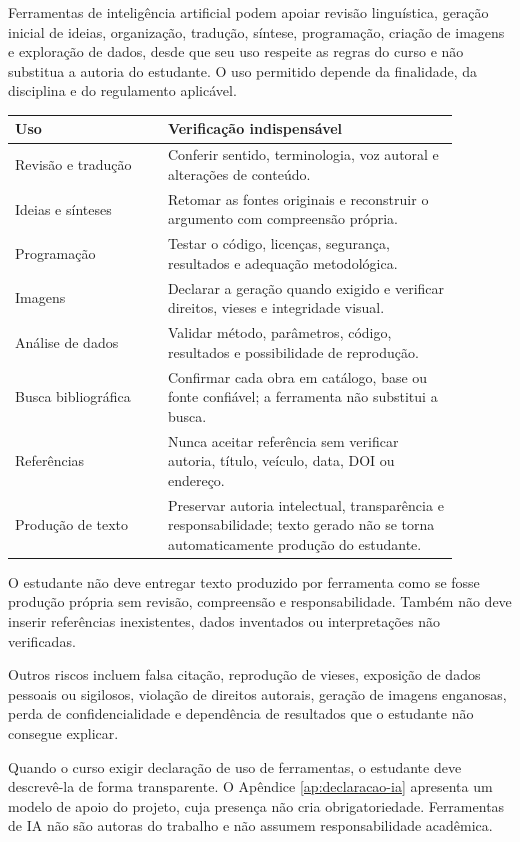 Ferramentas de inteligência artificial podem apoiar revisão linguística, geração inicial de ideias, organização, tradução, síntese, programação, criação de imagens e exploração de dados, desde que seu uso respeite as regras do curso e não substitua a autoria do estudante. O uso permitido depende da finalidade, da disciplina e do regulamento aplicável.

\begin{longtable}{p{0.30\linewidth}p{0.58\linewidth}}
\toprule
Uso & Verificação indispensável \\
\midrule
Revisão e tradução & Conferir sentido, terminologia, voz autoral e alterações de conteúdo. \\
Ideias e sínteses & Retomar as fontes originais e reconstruir o argumento com compreensão própria. \\
Programação & Testar o código, licenças, segurança, resultados e adequação metodológica. \\
Imagens & Declarar a geração quando exigido e verificar direitos, vieses e integridade visual. \\
Análise de dados & Validar método, parâmetros, código, resultados e possibilidade de reprodução. \\
Busca bibliográfica & Confirmar cada obra em catálogo, base ou fonte confiável; a ferramenta não substitui a busca. \\
Referências & Nunca aceitar referência sem verificar autoria, título, veículo, data, DOI ou endereço. \\
Produção de texto & Preservar autoria intelectual, transparência e responsabilidade; texto gerado não se torna automaticamente produção do estudante. \\
\bottomrule
\end{longtable}

O estudante não deve entregar texto produzido por ferramenta como se fosse produção própria sem revisão, compreensão e responsabilidade. Também não deve inserir referências inexistentes, dados inventados ou interpretações não verificadas.

Outros riscos incluem falsa citação, reprodução de vieses, exposição de dados pessoais ou sigilosos, violação de direitos autorais, geração de imagens enganosas, perda de confidencialidade e dependência de resultados que o estudante não consegue explicar.

Quando o curso exigir declaração de uso de ferramentas, o estudante deve descrevê-la de forma transparente. O Apêndice \ref{ap:declaracao-ia} apresenta um modelo de apoio do projeto, cuja presença não cria obrigatoriedade. Ferramentas de IA não são autoras do trabalho e não assumem responsabilidade acadêmica.

